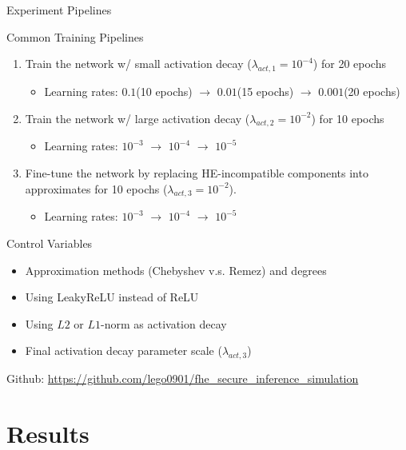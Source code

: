 \documentclass[9pt]{beamer}
\begin{document}
\begin{frame}{Experiment Pipelines}
    \begin{alertblock}{Common Training Pipelines}
        \begin{enumerate}
            \item Train the network w/ small activation decay ($\lambda_{act,1} = 10^{-4}$) for 20 epochs
                  \begin{itemize}
                      \item Learning rates: $0.1$(10 epochs) $\rightarrow$ $0.01$(15 epochs) $\rightarrow$ $0.001$(20 epochs)
                  \end{itemize}
            \item Train the network w/ \alert{large activation decay} ($\lambda_{act,2} = 10^{-2}$) for 10 epochs
                  \begin{itemize}
                      \item Learning rates: $10^{-3}$ $\rightarrow$ $10^{-4}$ $\rightarrow$ $10^{-5}$
                  \end{itemize}
            \item \alert{Fine-tune the network by replacing} HE-incompatible components into approximates for 10 epochs ($\lambda_{act,3} = 10^{-2}$).
                  \begin{itemize}
                      \item Learning rates: $10^{-3}$ $\rightarrow$ $10^{-4}$ $\rightarrow$ $10^{-5}$
                  \end{itemize}
        \end{enumerate}
    \end{alertblock}
    \begin{block}{Control Variables}
        \begin{itemize}
            \item Approximation methods (Chebyshev v.s. Remez) and degrees
            \item Using LeakyReLU instead of ReLU
            \item Using $L2$ or $L1$-norm as activation decay
            \item Final activation decay parameter scale ($\lambda_{act,3}$)
        \end{itemize}
    \end{block}
    Github: {\small\url{https://github.com/lego0901/fhe_secure_inference_simulation}}
\end{frame}

\section{Results}
\end{document}

